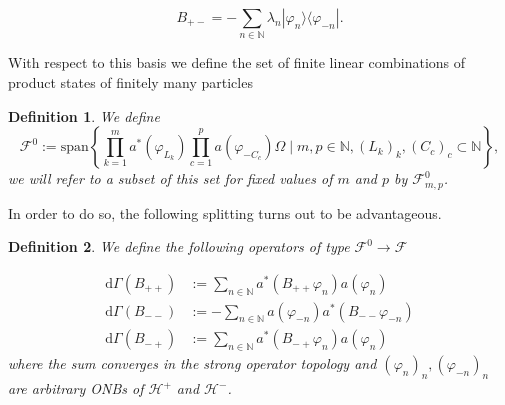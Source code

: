 \documentclass[b5paper,draft,openbib,12pt]{memoir}
\newtheorem{Def}{Definition}[section]
\begin{document}
\begin{equation}
B_{+-} = -\sum_{n\in\mathbb{N}} \lambda_n |\varphi_{n}\rangle \langle \varphi_{-n}|.
\end{equation}

With respect to this basis we define the set of finite linear combinations of product states of finitely many particles

\begin{Def}
We define
\begin{equation}
\mathcal{F}^0\!\!:=\! \mathrm{span}\!\! \left\{\prod_{k=1}^m \!a^*\!(\varphi_{L_k}\!)\!\prod_{c=1}^p\!\! a(\varphi_{-C_c})\Omega\mid m,p\!\in\!\!\mathbb{N}, (L_k)_k,\!(C_c)_c\!\subset\!\mathbb{N} \!\right\}\!,
\end{equation}
we will refer to a subset of this set for fixed values of \(m\) and \(p\) by \(\mathcal{F}^0_{m,p}\).
\end{Def}

In order to do so, the following splitting turns out to be advantageous. 

\begin{Def}
We define the following operators of type \(\mathcal{F}^0\rightarrow \mathcal{F}\)

\begin{align}\label{predefdGamma}
\mathrm{d}\Gamma(B_{++})&:= \sum_{n\in\mathbb{N}}  a^*(B_{++} \varphi_n) a(\varphi_n) \\
\mathrm{d}\Gamma(B_{--})&:= -\sum_{n\in\mathbb{N}}   a(\varphi_{-n})a^*(B_{--} \varphi_{-n}) \\
\mathrm{d}\Gamma(B_{-+})&:= \sum_{n\in\mathbb{N}}  a^*(B_{-+}\varphi_{n}) a(\varphi_n)
\end{align}
where the sum converges in the strong operator topology and \((\varphi_n)_n , (\varphi_{-n})_n\) are arbitrary ONBs of \(\mathcal{H}^+\) and \(\mathcal{H}^-\).
\end{Def}
\end{document}
